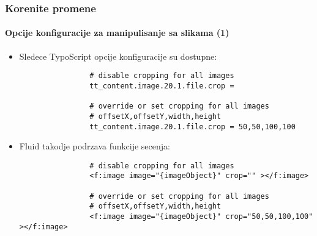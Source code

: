 \begin{frame}[fragile]
	\frametitle{Korenite promene}
	\framesubtitle{Opcije konfiguracije za manipulisanje sa slikama (1)}

	\begin{itemize}
		\item Sledece TypoScript opcije konfiguracije su dostupne:
			\begin{lstlisting}
				# disable cropping for all images
				tt_content.image.20.1.file.crop =

				# override or set cropping for all images
				# offsetX,offsetY,width,height
				tt_content.image.20.1.file.crop = 50,50,100,100
			\end{lstlisting}

		\item Fluid takodje podrzava funkcije secenja:
			\begin{lstlisting}
				# disable cropping for all images
				<f:image image="{imageObject}" crop="" ></f:image>

				# override or set cropping for all images
				# offsetX,offsetY,width,height
				<f:image image="{imageObject}" crop="50,50,100,100" ></f:image>
			\end{lstlisting}

	\end{itemize}

\end{frame}

